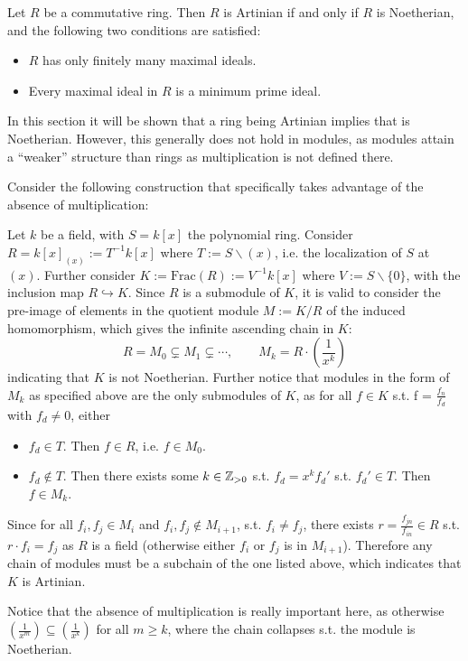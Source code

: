 \begin{theorem}\label{thm:Criterion for Artinian ring}
    Let $R$ be a commutative ring. Then $R$ is Artinian if and only if $R$ is Noetherian, and the following two conditions are satisfied:
    \begin{itemize}
        \item $R$ has only finitely many maximal ideals.
        \item Every maximal ideal in $R$ is a minimum prime ideal. 
    \end{itemize}
\end{theorem}

\begin{remark}
    In this section it will be shown that a ring being Artinian implies that is Noetherian. However, this generally does not hold in modules, as modules attain a ``weaker'' structure than rings as multiplication is not defined there.

    Consider the following construction that specifically takes advantage of the absence of multiplication:
    
    Let $k$ be a field, with $S = k[x]$ the polynomial ring. Consider $R = k[x]_{(x)} := T^{-1}k[x]$ where $T := S\smallsetminus (x)$, i.e. the localization of $S$ at $(x)$. Further consider $K := \mathrm{Frac}(R) := V^{-1}k[x]$ where $V := S\smallsetminus \{0\}$, with the inclusion map $R \hookrightarrow K$. Since $R$ is a submodule of $K$, it is valid to consider the pre-image of elements in the quotient module $M := K/R$ of the induced homomorphism, which gives the infinite ascending chain in $K$:
    \[
        R = M_0 \subsetneq M_1 \subsetneq \cdots, \qquad M_k = R\cdot\left( \frac{1}{x^k} \right)
    \]
    indicating that $K$ is not Noetherian. Further notice that modules in the form of $M_k$ as specified above are the only submodules of $K$, as for all $f\in K$ s.t. f = $\frac{f_n}{f_d}$ with $f_d \neq 0$, either
    \begin{itemize}
        \item $f_d \in T$. Then $f\in R$, i.e. $f\in M_0$.
        \item $f_d \notin T$. Then there exists some $k\in\mathbb{Z}_{>0}$ s.t. $f_d = x^k f_d'$ s.t. $f_d'\in T$. Then $f\in M_k$.
    \end{itemize}
    Since for all $f_i, f_j \in M_i$ and $f_i, f_j \notin M_{i+1}$, s.t. $f_i \neq f_j$, there exists $r = \frac{f_{jn}}{f_{in}}\in R$ s.t. $r\cdot f_i = f_j$ as $R$ is a field (otherwise either $f_i$ or $f_j$ is in $M_{i+1}$). Therefore any chain of modules must be a subchain of the one listed above, which indicates that $K$ is Artinian.

    Notice that the absence of multiplication is really important here, as otherwise $(\frac{1}{x^m}) \subseteq (\frac{1}{x^k})$ for all $m \geq k$, where the chain collapses s.t. the module is Noetherian. 
\end{remark}

